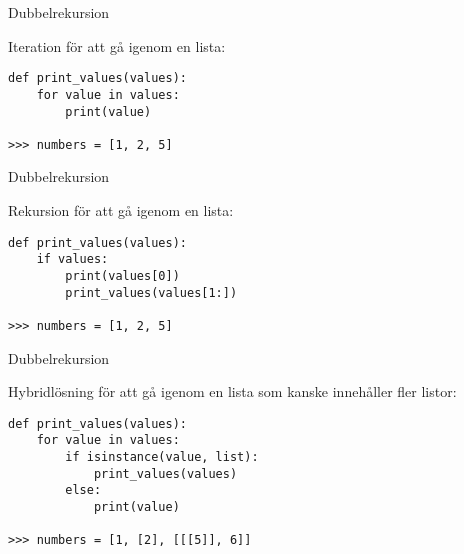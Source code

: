 \documentclass{beamer}
\begin{document}
  \begin{frame}[fragile]{Dubbelrekursion}

    Iteration för att gå igenom en lista:

    \begin{verbatim}
def print_values(values):
    for value in values:
        print(value)

>>> numbers = [1, 2, 5]
    \end{verbatim}

  \end{frame}

  \begin{frame}[fragile]{Dubbelrekursion}

    Rekursion för att gå igenom en lista:

    \begin{verbatim}
def print_values(values):
    if values:
        print(values[0])
        print_values(values[1:])

>>> numbers = [1, 2, 5]
    \end{verbatim}

  \end{frame}

  \begin{frame}[fragile]{Dubbelrekursion}

    Hybridlösning för att gå igenom en lista som kanske innehåller fler listor:

    \begin{verbatim}
def print_values(values):
    for value in values:
        if isinstance(value, list):
            print_values(values)
        else:
            print(value)

>>> numbers = [1, [2], [[[5]], 6]]

    \end{verbatim}

  \end{frame}
\end{document}
